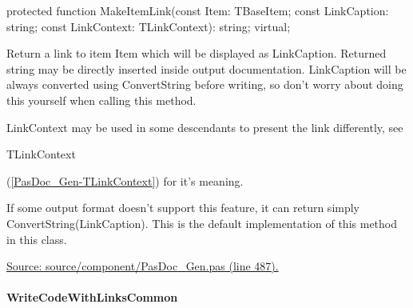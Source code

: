 \documentclass{report}
\newif\ifpdf
\begin{document}
\label{PasDoc_Gen.TDocGenerator-MakeItemLink}
\begin{list}{}{
\setlength{\itemindent}{0cm}
\setlength{\listparindent}{0cm}
\setlength{\leftmargin}{\evensidemargin}
\addtolength{\leftmargin}{\tmplength}
\settowidth{\labelsep}{X}
\addtolength{\leftmargin}{\labelsep}
\setlength{\labelwidth}{\tmplength}
}
\item[\textbf{Declaration}\hfill]
\ifpdf
\begin{flushleft}
\fi
\begin{ttfamily}
protected function MakeItemLink(const Item: TBaseItem; const LinkCaption: string; const LinkContext: TLinkContext): string; virtual;\end{ttfamily}

\ifpdf
\end{flushleft}
\fi

\par
\item[\textbf{Description}]
Return a link to item Item which will be displayed as LinkCaption. Returned string may be directly inserted inside output documentation. LinkCaption will be always converted using ConvertString before writing, so don't worry about doing this yourself when calling this method.

LinkContext may be used in some descendants to present the link differently, see \begin{ttfamily}TLinkContext\end{ttfamily}(\ref{PasDoc_Gen-TLinkContext}) for it's meaning.

If some output format doesn't support this feature, it can return simply ConvertString(LinkCaption). This is the default implementation of this method in this class.\par
\href{https://github.com/pasdoc/pasdoc/blob/master/source/component/PasDoc_Gen.pas#L487}{Source: source/component/PasDoc{\_}Gen.pas (line 487).}

\end{list}
\paragraph*{WriteCodeWithLinksCommon}\hspace*{\fill}
\end{document}
